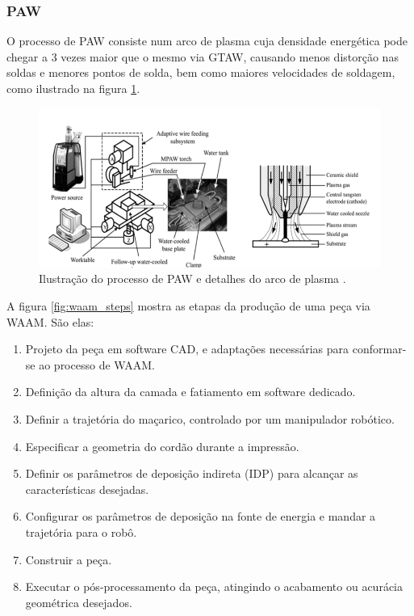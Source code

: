 \subsubsection{PAW}
O processo de PAW consiste num arco de plasma cuja densidade energética pode chegar a 3 vezes maior que o mesmo via GTAW, causando menos distorção nas soldas e menores pontos de solda, bem como maiores velocidades de soldagem, como ilustrado na figura \ref{fig:paw_scheme}. 

\begin{figure}[hbt!]
    \centering
    \includegraphics[width=0.7\linewidth]{Imagens/chap02/paw_scheme.png}
    \caption{Ilustração do processo de PAW e detalhes do arco de plasma \cite{aiyiti2006investigation}.}
    \label{fig:paw_scheme}
\end{figure}

\newpage
A figura \ref{fig:waam_steps} mostra as etapas da produção de uma peça via WAAM. São elas:
\begin{enumerate}[label=(\textit{\roman*})]
    \item Projeto da peça em software CAD, e adaptações necessárias para conformar-se ao processo de WAAM.
    \item  Definição da altura da camada e fatiamento em software dedicado.
    \item Definir a trajetória do maçarico, controlado por um manipulador robótico.
    \item Especificar a geometria do cordão durante a impressão.
    \item Definir os parâmetros de deposição indireta (IDP) para alcançar as características desejadas.
    \item Configurar os parâmetros de deposição na fonte de energia e mandar a trajetória para o robô. 
    \item Construir a peça. 
    \item Executar o pós-processamento da peça, atingindo o acabamento ou acurácia geométrica desejados.
\end{enumerate}


